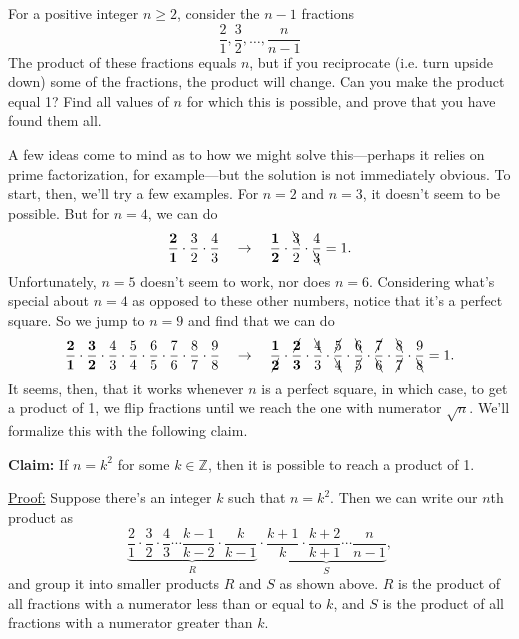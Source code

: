 \begin{problem}[C][5][BAMO 2013/4]
    For a positive integer $n \geq 2$, consider the $n-1$ fractions
    $$ \frac{2}{1}, \frac{3}{2}, \ldots, \frac{n}{n-1}$$
    The product of these fractions equals $n$, but if you reciprocate (i.e. turn upside down) some of the fractions, the product will change. Can you make the product equal 1? Find all values of $n$ for which this is possible, and prove that you have found them all.
\end{problem}

\begin{solution}
    A few ideas come to mind as to how we might solve this---perhaps it relies on prime factorization, for example---but the solution is not immediately obvious. To start, then, we'll try a few examples. For $n=2$ and $n=3$, it doesn't seem to be possible. But for $n=4$, we can do
    \[
        \mathbf{\frac{2}{1}}\cdot\frac{3}{2}\cdot\frac{4}{3} 
        \quad \rightarrow \quad 
        \mathbf{\frac{1}{2}}\cdot\frac{\bcancel{3}}{2}\cdot\frac{4}{\bcancel{3}} 
        = 1.
    \]
    Unfortunately, $n=5$ doesn't seem to work, nor does $n=6$. Considering what's special about $n=4$ as opposed to these other numbers, notice that it's a perfect square. So we jump to $n=9$ and find that we can do
\[
    \mathbf{\frac{2}{1}\cdot\frac{3}{2}}\cdot\frac{4}{3}\cdot\frac{5}{4}\cdot\frac{6}{5}\cdot\frac{7}{6}\cdot\frac{8}{7}\cdot\frac{9}{8}
    \quad \rightarrow \quad
    \mathbf{\frac{1}{\cancel{\mathbf{2}}}\cdot\frac{\cancel{\mathbf{2}}}{3}} \cdot \frac{\bcancel{4}}{3} \cdot \frac{\cancel{5}}{\bcancel{4}} \cdot \frac{\bcancel{6}}{\cancel{5}} \cdot \frac{\cancel{7}}{\bcancel{6}} \cdot \frac{\bcancel{8}}{\cancel{7}} \cdot \frac{9}{\bcancel{8}} = 1.
\]
It seems, then, that it works whenever $n$ is a perfect square, in which case, to get a product of 1, we flip fractions until we reach the one with numerator $\sqrt{n}$. We'll formalize this with the following claim.

\textbf{Claim:} If $n=k^2$ for some $k\in\mathbb{Z}$, then it is possible to reach a product of 1.

\underline{Proof:} Suppose there's an integer $k$ such that $n=k^2$. Then we can write our $n$th product as
\[
\underbrace{\frac{2}{1} \cdot \frac{3}{2} \cdot \frac{4}{3} \cdots \frac{k-1}{k-2} \cdot \frac{k}{k-1}}_{\text{$R$}} \cdot \underbrace{\frac{k+1}{k} \cdot \frac{k+2}{k+1} \cdots \frac{n}{n-1}}_{\text{$S$}},
\]
and group it into smaller products $R$ and $S$ as shown above. $R$ is the product of all fractions with a numerator less than or equal to $k$, and $S$ is the product of all fractions with a numerator greater than $k$.


\end{solution}
